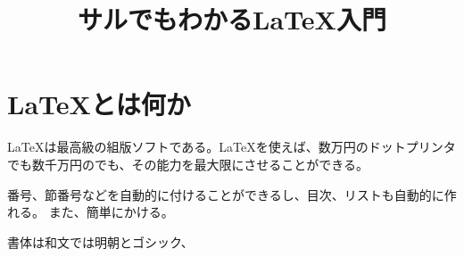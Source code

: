 \documentclass[a4j]{jarticle}
\begin{document}
\title{サルでもわかる\LaTeX 入門}

\author{}

\date{}

\maketitle

\section{\LaTeX とは何か}

\LaTeX は最高級の組版ソフトである。\LaTeX を使えば、数万円のドットプリンタでも数千万円のでも、その能力を最大限にさせることができる。

番号、節番号などを自動的に付けることができるし、目次、リストも自動的に作れる。
また、簡単にかける。

書体は和文では明朝とゴシック、
\end{document}
